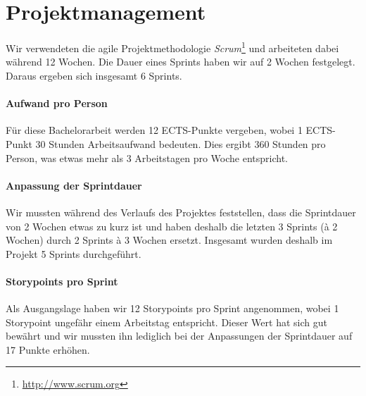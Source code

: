 \chapter{Projektmanagement}
\label{projektmanagement}

Wir verwendeten die agile Projektmethodologie \emph{Scrum}\footnote{\url{http://www.scrum.org}} und arbeiteten dabei während 12 Wochen.
Die Dauer eines Sprints haben wir auf 2 Wochen festgelegt. Daraus ergeben sich insgesamt 6 Sprints.

\subsubsection{Aufwand pro Person}
Für diese Bachelorarbeit werden 12 ECTS-Punkte vergeben, wobei 1 ECTS-Punkt 30 Stunden Arbeitsaufwand bedeuten.
Dies ergibt 360 Stunden pro Person, was etwas mehr als 3 Arbeitstagen pro Woche entspricht.

\subsubsection{Anpassung der Sprintdauer}
Wir mussten während des Verlaufs des Projektes feststellen, dass die Sprintdauer von 2 Wochen etwas zu kurz ist und haben deshalb die letzten 3 Sprints (à 2 Wochen) durch 2 Sprints à 3 Wochen ersetzt. Insgesamt wurden deshalb im Projekt 5 Sprints durchgeführt. 

\subsubsection{Storypoints pro Sprint}
Als Ausgangslage haben wir 12 Storypoints pro Sprint angenommen, wobei 1 Storypoint ungefähr einem Arbeitstag entspricht. 
Dieser Wert hat sich gut bewährt und wir mussten ihn lediglich bei der Anpassungen der Sprintdauer auf 17 Punkte erhöhen.

